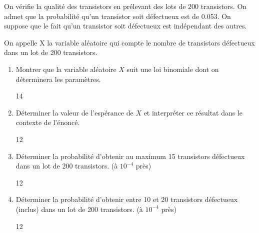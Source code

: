 \documentclass[a4paper,10pt]{report}
\begin{document}
\pagebreak

\thispagestyle{DS_LP}


\medskip

On vérifie la qualité des transistors en prélevant des lots de 200 transistors. On admet que la probabilité qu'un transistor soit défectueux est de 0.053. On suppose que le fait qu'un transistor soit défectueux est indépendant des autres.

On appelle X la variable aléatoire qui compte le nombre de transistors défectueux dans un lot de 200 transistors.

\begin{enumerate}[resume]
    \item Montrer que la variable aléatoire $X$ suit une loi binomiale dont on déterminera les paramètres.
    \begin{answer}{1}{4}    \end{answer}
    
    \item Déterminer la valeur de l'espérance de $X$ et interpréter ce résultat dans le contexte de l'énoncé.
        \begin{answer}{1}{2}    \end{answer}

    \item Déterminer la probabilité d'obtenir au maximum 15 transistors défectueux dans un lot de 200 transistors. (à $10^{-4}$ près)
    \begin{answer}{1}{2}    \end{answer}

    \item Déterminer la probabilité d'obtenir entre 10 et 20 transistors défectueux (inclus) dans un lot de 200 transistors. (à $10^{-4}$ près)
    \begin{answer}{1}{2}    \end{answer}

\end{enumerate}

\medskip





\medskip
\end{document}
